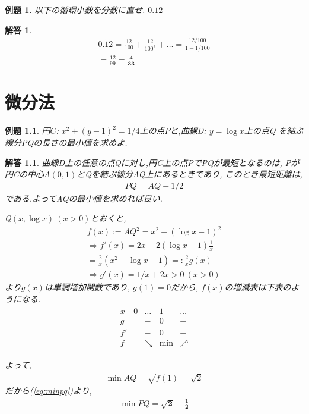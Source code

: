 \documentclass[a4paper,11pt,twocolumn,uplatex]{jsbook}
\newtheorem{example}{例題}[section]
\newtheorem*{solution}{解答}
\begin{document}
\begin{screen}
  \begin{example}
    以下の循環小数を分数に直せ.
    $0.\dot{1}\dot{2}$
  \end{example}
\end{screen}
\begin{solution}
  \begin{eqnarray}
    0.\dot{1}\dot{2} = \frac{12}{100} + \frac{12}{100^2} + \dots 
    = \frac{12/100}{1-1/100} \nonumber \\
    = \frac{12}{99} = \bm{\frac{4}{33}} \nonumber
  \end{eqnarray}
\end{solution}


\chapter{微分法}

\begin{screen}
  \begin{example}
    円$C$: $x^2+(y-1)^2=1/4$上の点$P$と,曲線D: $y=\log x$上の点Q
    を結ぶ線分PQの長さの最小値を求めよ.
  \end{example}
\end{screen}
\begin{solution}
  曲線D上の任意の点Qに対し,円C上の点PでPQが最短となるのは,
  Pが円Cの中心$A(0,1)$とQを結ぶ線分AQ上にあるときであり,
  このとき最短距離は,
  \begin{eqnarray}
    PQ = AQ - 1/2
    \label{eq:minpq}
  \end{eqnarray}
  である.よってAQの最小値を求めれば良い.

  Q$(x,\log x)\ (x>0)$とおくと,
  \begin{eqnarray}
    f(x) := AQ^2
    = x^2 + (\log x - 1)^2 \nonumber \\
    \Rightarrow f'(x) = 2x + 2(\log x - 1)\frac{1}{x} \nonumber \\
    = \frac{2}{x} (x^2 + \log x - 1) 
    =: \frac{2}{x} g(x) \nonumber \\
    \Rightarrow g'(x) = 1/x + 2x > 0 \ (x>0) \nonumber
  \end{eqnarray}
  より$g(x)$は単調増加関数であり, $g(1) = 0$だから,
  $f(x)$の増減表は下表のようになる.
  \begin{eqnarray}
    \begin{array}{c|cccc}
      x & 0 & \dots & 1 & \dots \\ \hline
      g && - & 0 & + \\
      f' && - & 0 & + \\
      f && \searrow & \min & \nearrow \nonumber
    \end{array}
  \end{eqnarray}

  よって,
  \begin{eqnarray}
    \min AQ = \sqrt{f(1)} = \sqrt{2} \nonumber 
  \end{eqnarray}
  だから(\ref{eq:minpq})より,
  \begin{eqnarray}
    \min PQ = \bm{\sqrt{2} - \frac{1}{2}} \nonumber
  \end{eqnarray}
\end{solution}
\end{document}
